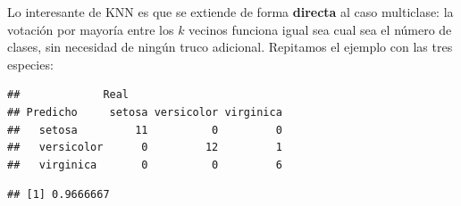 \documentclass[
]{book}
\newenvironment{Shaded}{\begin{snugshade}}{\end{snugshade}}
\newcommand{\AttributeTok}[1]{\textcolor[rgb]{0.13,0.29,0.53}{#1}}
\newcommand{\DecValTok}[1]{\textcolor[rgb]{0.00,0.00,0.81}{#1}}
\newcommand{\FloatTok}[1]{\textcolor[rgb]{0.00,0.00,0.81}{#1}}
\newcommand{\FunctionTok}[1]{\textcolor[rgb]{0.13,0.29,0.53}{\textbf{#1}}}
\newcommand{\NormalTok}[1]{#1}
\newcommand{\OtherTok}[1]{\textcolor[rgb]{0.56,0.35,0.01}{#1}}
\newcommand{\SpecialCharTok}[1]{\textcolor[rgb]{0.81,0.36,0.00}{\textbf{#1}}}
\newcommand{\StringTok}[1]{\textcolor[rgb]{0.31,0.60,0.02}{#1}}
\theoremstyle{break}
\theoremstyle{nonumberplain}
\begin{document}
Lo interesante de KNN es que se extiende de forma \textbf{directa} al caso multiclase: la votación por mayoría entre los \(k\) vecinos funciona igual sea cual sea el número de clases, sin necesidad de ningún truco adicional. Repitamos el ejemplo con las tres especies:

\begin{Shaded}
\end{Shaded}

\begin{verbatim}
##             Real
## Predicho     setosa versicolor virginica
##   setosa         11          0         0
##   versicolor      0         12         1
##   virginica       0          0         6
\end{verbatim}

\begin{Shaded}
\end{Shaded}

\begin{verbatim}
## [1] 0.9666667
\end{verbatim}
\end{document}
